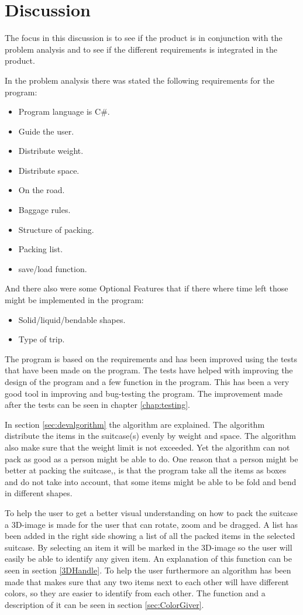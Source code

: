 \section{Discussion}
The focus in this discussion is to see if the product is in conjunction with the problem analysis and to see if the different requirements is integrated in the product.

In the problem analysis there was stated the following requirements for the program:

\begin{itemize}
\item Program language is C\#.
\item Guide the user.
\item Distribute weight.
\item Distribute space.
\item On the road.
\item Baggage rules.
\item Structure of packing.
\item Packing list.
\item save/load function.
\end{itemize}

And there also were some Optional Features that if there where time left those might be implemented in the program:
\begin{itemize}
\item Solid/liquid/bendable shapes.
\item Type of trip.
\end{itemize}

The program is based on the requirements and has been improved using the tests that have been made on the program. The tests have helped with improving the design of the program and a few function in the program. This has been a very good tool in improving and bug-testing the program. The improvement made after the tests can be seen in chapter \ref{chap:testing}.

In section \ref{sec:devalgorithm} the algorithm are explained. The algorithm distribute the items in the suitcase(s) evenly by weight and space. The algorithm also make sure that the weight limit is not exceeded. Yet the algorithm can not pack as good as a person might be able to do. One reason that a person might be better at packing the suitcase,, is that the program take all the items as boxes and do not take into account, that some items might be able to be fold and bend in different shapes.

To help the user to get a better visual understanding on how to pack the suitcase a 3D-image is made for the user that can rotate, zoom and be dragged. A list has been added in the right side showing a list of all the packed items in the selected suitcase. By selecting an item it will be marked in the 3D-image so the user will easily be able to identify any given item. An explanation of this function can be seen in section \ref{3DHandle}. To help the user furthermore an algorithm has been made that makes sure that any two items next to each other will have different colors, so they are easier to identify from each other. The function and a description of it can be seen in section \ref{sec:ColorGiver}.

